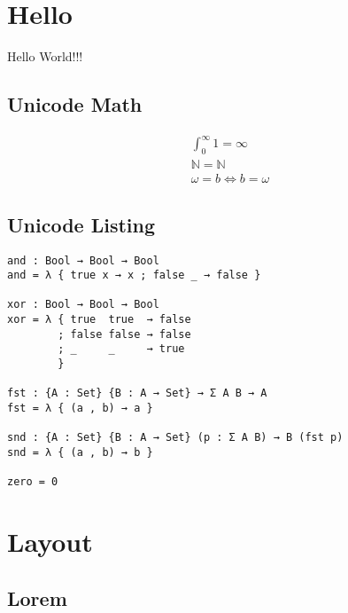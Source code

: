 \documentclass[]{article}
\begin{document}
\section{Hello}
Hello World!!!

\subsection{Unicode Math}
\begin{align*}
	∫_0^∞ 1 = ∞ \\
	\mathbb{N} = ℕ \\
	ω = b ⇔ b = ω
\end{align*}

\subsection{Unicode Listing}
\begin{lstlisting}
and : Bool → Bool → Bool
and = λ { true x → x ; false _ → false }

xor : Bool → Bool → Bool
xor = λ { true  true  → false
        ; false false → false
        ; _     _     → true
        }

fst : {A : Set} {B : A → Set} → Σ A B → A
fst = λ { (a , b) → a }

snd : {A : Set} {B : A → Set} (p : Σ A B) → B (fst p)
snd = λ { (a , b) → b }

zero = 0
\end{lstlisting}

\section{Layout}
\subsection{Lorem}
\lipsum[2-4]
\end{document}
